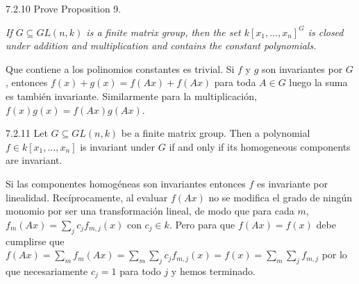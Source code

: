 \documentclass[twoside]{article}
\begin{document}
\begin{ejercicio}{7.2.10}
Prove Proposition 9.
\end{ejercicio}
\begin{solucion}
\emph{If $G ⊆ GL(n, k)$ is a finite matrix group, then the set $k[x_1, \dots , x_n]^G$
is closed under addition and multiplication and contains the constant polynomials.}


Que contiene a los polinomios constantes es trivial. Si $f$ y $g$ son invariantes por $G$, entonces $f(x)+g(x)=f(Ax)+f(Ax)$ para toda $A\in G$ luego la suma es también invariante. Similarmente para la multiplicación, $f(x)g(x)=f(Ax)g(Ax)$. 
\end{solucion}

\newpage

\begin{ejercicio}{7.2.11}
Let $G ⊆ GL(n, k)$ be a finite matrix group. Then a polynomial
$f ∈ k[x_1, \dots , x_n]$ is invariant under $G$ if and only if its homogeneous components
are invariant.
\end{ejercicio}
\begin{solucion}
Si las componentes homogéneas son invariantes entonces $f$ es invariante por linealidad. Recíprocamente, al evaluar $f(Ax)$ no se modifica el grado de ningún monomio por ser una transformación lineal, de modo que para cada $m$, $f_m(Ax)=\sum_j c_jf_{m,j}(x)$ con $c_j\in k$. Pero para que $f(Ax)=f(x)$ debe cumplirse que $f(Ax)=\sum_m f_m(Ax)=\sum_m\sum_j c_jf_{m,j}(x)=f(x)=\sum_m\sum_j f_{m,j}$ por lo que necesariamente $c_j=1$ para todo $j$ y hemos terminado.

\end{solucion}
\end{document}

